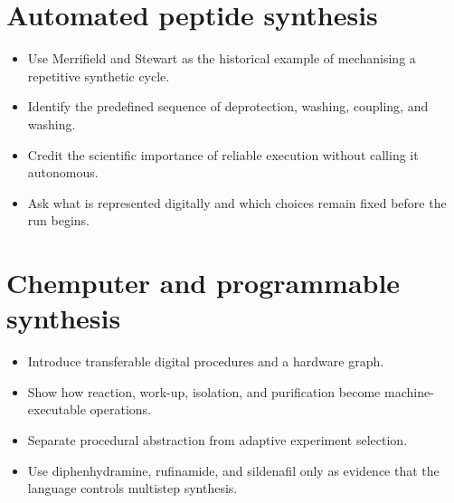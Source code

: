 \section{Automated peptide synthesis}

\begin{itemize}
  \item Use Merrifield and Stewart as the historical example of mechanising a repetitive synthetic cycle.
  \item Identify the predefined sequence of deprotection, washing, coupling, and washing.
  \item Credit the scientific importance of reliable execution without calling it autonomous.
  \item Ask what is represented digitally and which choices remain fixed before the run begins.
\end{itemize}

\section{Chemputer and programmable synthesis}

\begin{itemize}
  \item Introduce transferable digital procedures and a hardware graph.
  \item Show how reaction, work-up, isolation, and purification become machine-executable operations.
  \item Separate procedural abstraction from adaptive experiment selection.
  \item Use diphenhydramine, rufinamide, and sildenafil only as evidence that the language controls multistep synthesis.
\end{itemize}


